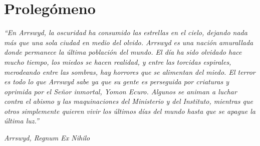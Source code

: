 
\part{Prolegómeno}
\thispagestyle{empty}
\vspace*{\fill}
\epigraph{\textit{“En Arrswyd, la oscuridad ha consumido las estrellas en el cielo, 
dejando nada más que una sola ciudad en medio del olvido. Arrswyd es una nación amurallada 
donde permanece la última población del mundo. El día ha sido olvidado hace mucho tiempo, 
los miedos se hacen realidad, y entre las torcidas espirales, merodeando entre las sombras, 
hay horrores que se alimentan del miedo. El terror es todo lo que Arrswyd sabe ya que su gente 
es perseguida por criaturas y oprimida por el Señor inmortal, Yomon Ecuro. Algunos se animan a 
luchar contra el abismo y las maquinaciones del Ministerio y del Instituto, mientras que otros 
simplemente quieren vivir los últimos días del mundo hasta que se apague la última luz.”}}{\textit{Arrswyd, Regnum Ex Nihilo}}
\vspace*{\fill}

\newpage

\blankpage{}


\blankpage{}


\blankpage{}
